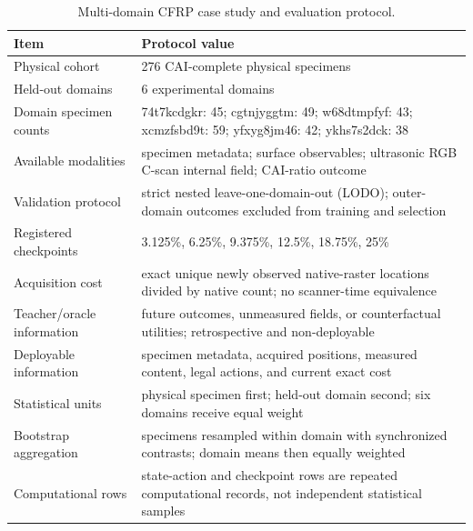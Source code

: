 \begin{table}[t]
\centering
\caption{Multi-domain CFRP case study and evaluation protocol.}
\label{tab:case-protocol}
\small
\begin{tabularx}{\textwidth}{@{}>{\RaggedRight\arraybackslash}p{}Y@{}}
\toprule
Item & Protocol value \\
\midrule
Physical cohort & 276 CAI-complete physical specimens \\
Held-out domains & 6 experimental domains \\
Domain specimen counts & 74t7kcdgkr: 45; cgtnjyggtm: 49; w68dtmpfyf: 43; xcmzfsbd9t: 59; yfxyg8jm46: 42; ykhs7s2dck: 38 \\
Available modalities & specimen metadata; surface observables; ultrasonic RGB C-scan internal field; CAI-ratio outcome \\
Validation protocol & strict nested leave-one-domain-out (LODO); outer-domain outcomes excluded from training and selection \\
Registered checkpoints & 3.125\%, 6.25\%, 9.375\%, 12.5\%, 18.75\%, 25\% \\
Acquisition cost & exact unique newly observed native-raster locations divided by native count; no scanner-time equivalence \\
Teacher/oracle information & future outcomes, unmeasured fields, or counterfactual utilities; retrospective and non-deployable \\
Deployable information & specimen metadata, acquired positions, measured content, legal actions, and current exact cost \\
Statistical units & physical specimen first; held-out domain second; six domains receive equal weight \\
Bootstrap aggregation & specimens resampled within domain with synchronized contrasts; domain means then equally weighted \\
Computational rows & state-action and checkpoint rows are repeated computational records, not independent statistical samples \\
\bottomrule
\end{tabularx}
\end{table}

